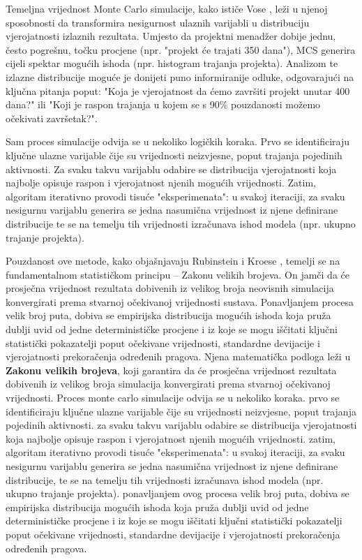 Temeljna vrijednost Monte Carlo simulacije, kako ističe Vose \cite{Vose2008}, leži u njenoj sposobnosti da transformira nesigurnost ulaznih varijabli u distribuciju vjerojatnosti izlaznih rezultata. Umjesto da projektni menadžer dobije jednu, često pogrešnu, točku procjene (npr. "projekt će trajati 350 dana"), MCS generira cijeli spektar mogućih ishoda (npr. histogram trajanja projekta). Analizom te izlazne distribucije moguće je donijeti puno informiranije odluke, odgovarajući na ključna pitanja poput: "Koja je vjerojatnost da ćemo završiti projekt unutar 400 dana?" ili "Koji je raspon trajanja u kojem se s 90\% pouzdanosti možemo očekivati završetak?".

Sam proces simulacije odvija se u nekoliko logičkih koraka. Prvo se identificiraju ključne ulazne varijable čije su vrijednosti neizvjesne, poput trajanja pojedinih aktivnosti. Za svaku takvu varijablu odabire se distribucija vjerojatnosti koja najbolje opisuje raspon i vjerojatnost njenih mogućih vrijednosti. Zatim, algoritam iterativno provodi tisuće "eksperimenata": u svakoj iteraciji, za svaku nesigurnu varijablu generira se jedna nasumična vrijednost iz njene definirane distribucije te se na temelju tih vrijednosti izračunava ishod modela (npr. ukupno trajanje projekta).

Pouzdanost ove metode, kako objašnjavaju Rubinstein i Kroese \cite{Rubinstein2016}, temelji se na fundamentalnom statističkom principu – Zakonu velikih brojeva. On jamči da će prosječna vrijednost rezultata dobivenih iz velikog broja neovisnih simulacija konvergirati prema stvarnoj očekivanoj vrijednosti sustava. Ponavljanjem procesa velik broj puta, dobiva se empirijska distribucija mogućih ishoda koja pruža dublji uvid od jedne determinističke procjene i iz koje se mogu iščitati ključni statistički pokazatelji poput očekivane vrijednosti, standardne devijacije i vjerojatnosti prekoračenja određenih pragova.
Njena matematička podloga leži u \textbf{Zakonu velikih brojeva}, koji garantira da će prosječna vrijednost rezultata dobivenih iz velikog broja simulacija konvergirati prema stvarnoj očekivanoj vrijednosti.
Proces monte carlo simulacije odvija se u nekoliko koraka. prvo se identificiraju ključne ulazne varijable čije su vrijednosti neizvjesne, poput trajanja pojedinih aktivnosti. za svaku takvu varijablu odabire se distribucija vjerojatnosti koja najbolje opisuje raspon i vjerojatnost njenih mogućih vrijednosti. zatim, algoritam iterativno provodi tisuće "eksperimenata": u svakoj iteraciji, za svaku nesigurnu varijablu generira se jedna nasumična vrijednost iz njene definirane distribucije, te se na temelju tih vrijednosti izračunava ishod modela (npr. ukupno trajanje projekta). ponavljanjem ovog procesa velik broj puta, dobiva se empirijska distribucija mogućih ishoda koja pruža dublji uvid od jedne determinističke procjene i iz koje se mogu iščitati ključni statistički pokazatelji poput očekivane vrijednosti, standardne devijacije i vjerojatnosti prekoračenja određenih pragova.

